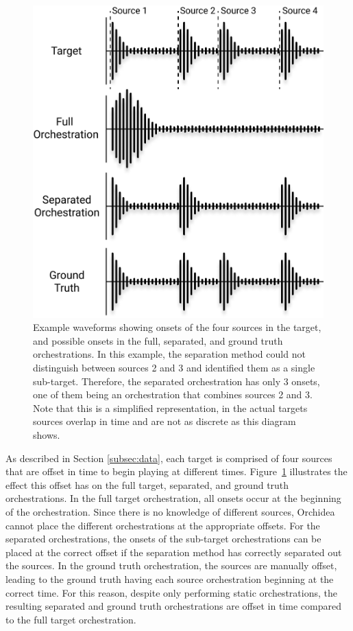 \documentclass{article}
\begin{document}
    \begin{figure}[t]
    \centering
      \includegraphics[width=\columnwidth]{figures/orch.jpg}
      \caption{Example waveforms showing onsets of the four sources in the target, and possible onsets in the full, separated, and ground truth orchestrations. In this example, the separation method could not distinguish between sources 2 and 3 and identified them as a single sub-target. Therefore, the separated orchestration has only 3 onsets, one of them being an orchestration that combines sources 2 and 3. Note that this is a simplified representation, in the actual targets sources overlap in time and are not as discrete as this diagram shows.}\label{fig:orchestrations}
    \end{figure}    
    
    As described in Section \ref{subsec:data}, each target is comprised of four sources that are offset in time to begin playing at different times. Figure~\ref{fig:orchestrations} illustrates the effect this offset has on the full target, separated, and ground truth orchestrations. In the full target orchestration, all onsets occur at the beginning of the orchestration. Since there is no knowledge of different sources, Orchidea cannot place the different orchestrations at the appropriate offsets. For the separated orchestrations, the onsets of the sub-target orchestrations can be placed at the correct offset if the separation method has correctly separated out the sources. In the ground truth orchestration, the sources are manually offset, leading to the ground truth having each source orchestration beginning at the correct time. For this reason, despite only performing static orchestrations, the resulting separated and ground truth orchestrations are offset in time compared to the full target orchestration.
    
\end{document}
